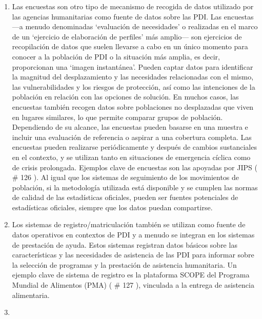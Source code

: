 \documentclass[
]{book}
\begin{document}
\begin{enumerate}
\item
  Las encuestas son otro tipo de mecanismo de recogida de datos utilizado por las agencias humanitarias como fuente de datos sobre las PDI. Las encuestas ---a menudo denominadas `evaluación de necesidades' o realizadas en el marco de un `ejercicio de elaboración de perfiles' más amplio--- son ejercicios de recopilación de datos que suelen llevarse a cabo en un único momento para conocer a la población de PDI o la situación más amplia, es decir, proporcionan una `imagen instantánea'. Pueden captar datos para identificar la magnitud del desplazamiento y las necesidades relacionadas con el mismo, las vulnerabilidades y los riesgos de protección, así como las intenciones de la población en relación con las opciones de solución. En muchos casos, las encuestas también recogen datos sobre poblaciones no desplazadas que viven en lugares similares, lo que permite comparar grupos de población. Dependiendo de su alcance, las encuestas pueden basarse en una muestra e incluir una evaluación de referencia o aspirar a una cobertura completa. Las encuestas pueden realizarse periódicamente y después de cambios sustanciales en el contexto, y se utilizan tanto en situaciones de emergencia cíclica como de crisis prolongada. Ejemplos clave de encuestas son las apoyadas por JIPS (
  \# 126
  ). Al igual que los sistemas de seguimiento de los movimientos de población, si la metodología utilizada está disponible y se cumplen las normas de calidad de las estadísticas oficiales, pueden ser fuentes potenciales de estadísticas oficiales, siempre que los datos puedan compartirse.
\item
  Los sistemas de registro/matriculación también se utilizan como fuente de datos operativos en contextos de PDI y a menudo se integran en los sistemas de prestación de ayuda. Estos sistemas registran datos básicos sobre las características y las necesidades de asistencia de las PDI para informar sobre la selección de programas y la prestación de asistencia humanitaria. Un ejemplo clave de sistema de registro es la plataforma SCOPE del Programa Mundial de Alimentos (PMA) (
  \# 127
  ), vinculada a la entrega de asistencia alimentaria.
\item ~
  \hypertarget{descripciuxf3n-de-las-fuentes-cualitativas-de-datos-operativos}{%
}
\end{enumerate}
\end{document}
